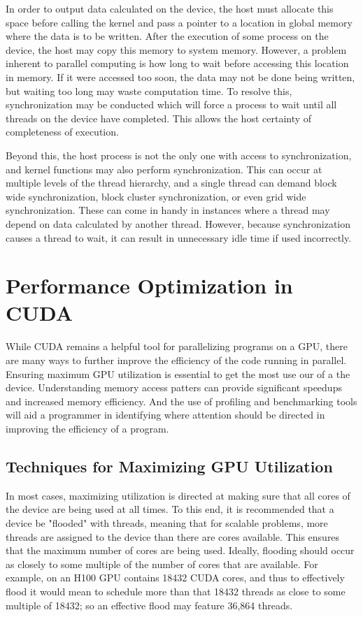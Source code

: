 \documentclass[11pt]{report}
\begin{document}
    In order to output data calculated on the device, the host must allocate this space before calling the kernel and pass a pointer to a location in global memory where the data is to be written. After the execution of some process on the device, the host may copy this memory to system memory. However, a problem inherent to parallel computing is how long to wait before accessing this location in memory. If it were accessed too soon, the data may not be done being written, but waiting too long may waste computation time. To resolve this, synchronization may be conducted which will force a process to wait until all threads on the device have completed. This allows the host certainty of completeness of execution. 

    Beyond this, the host process is not the only one with access to synchronization, and kernel functions may also perform synchronization. This can occur at multiple levels of the thread hierarchy, and a single thread can demand block wide synchronization, block cluster synchronization, or even grid wide synchronization. These can come in handy in instances where a thread may depend on data calculated by another thread. However, because synchronization causes a thread to wait, it can result in unnecessary idle time if used incorrectly. 

\section{Performance Optimization in CUDA}
While CUDA remains a helpful tool for parallelizing programs on a GPU, there are many ways to further improve the efficiency of the code running in parallel. Ensuring maximum GPU utilization is essential to get the most use our of a the device. Understanding memory access patters can provide significant speedups and increased memory efficiency. And the use of profiling and benchmarking tools will aid a programmer in identifying where attention should be directed in improving the efficiency of a program.

    \subsection{Techniques for Maximizing GPU Utilization}
    In most cases, maximizing utilization is directed at making sure that all cores of the device are being used at all times. To this end, it is recommended that a device be "flooded" with threads, meaning that for scalable problems, more threads are assigned to the device than there are cores available. This ensures that the maximum number of cores are being used. Ideally, flooding should occur as closely to some multiple of the number of cores that are available. For example, on an H100 GPU contains 18432 CUDA cores\cite{H100_ARCHITECTURE}, and thus to effectively flood it would mean to schedule more than that 18432 threads as close to some multiple of 18432; so an effective flood may feature 36,864 threads.
\end{document}
